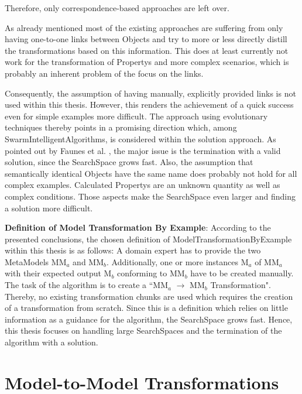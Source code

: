 Therefore, only correspondence-based approaches are left over.

As already mentioned most of the existing approaches are suffering from only having one-to-one links between \glspl{Object} and try to more or less directly distill the transformations based on this information. This does at least currently not work for the transformation of \glspl{Property} and more complex scenarios, which is probably an inherent problem of the focus on the links. %

Consequently, the assumption of having manually, explicitly provided links is not used within this thesis. However, this renders the achievement of a quick success even for simple examples more difficult. The approach using evolutionary techniques thereby points in a promising direction which, among \glspl{SwarmIntelligentAlgorithm}, is considered within the solution approach. As pointed out by Faunes et al. \cite{Faunes2013}, the major issue is the termination with a valid solution, since the \gls{SearchSpace} grows fast. Also, the assumption that semantically identical \glspl{Object} have the same name does probably not hold for all complex examples. Calculated \glspl{Property} are an unknown quantity as well as complex conditions. Those aspects make the \gls{SearchSpace} even larger and finding a solution more difficult.

\textbf{Definition of Model Transformation By Example}: According to the presented conclusions, the chosen definition of \gls{ModelTransformationByExample} within this thesis is as follows: A domain expert has to provide the two \glspl{MetaModel} MM$_a$ and MM$_b$. Additionally, one or more instances M$_a$ of MM$_a$ with their expected output M$_b$ conforming to MM$_b$ have to be created manually. The task of the algorithm is to create a ``MM$_a$ $\rightarrow$ MM$_b$ Transformation". Thereby, no existing transformation chunks are used which requires the creation of a transformation from scratch. Since this is a definition which relies on little information as a guidance for the algorithm, the \gls{SearchSpace} grows fast. Hence, this thesis focuses on handling large \glspl{SearchSpace} and the termination of the algorithm with a solution.

\section{Model-to-Model Transformations}\label{secModelToModelTransformations}

